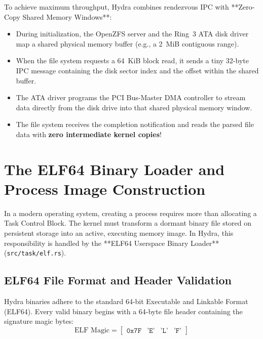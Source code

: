 To achieve maximum throughput, Hydra combines rendezvous IPC with **Zero-Copy Shared Memory Windows**:
\begin{itemize}
    \item During initialization, the OpenZFS server and the Ring~3 ATA disk driver map a shared physical memory buffer (e.g., a 2~MiB contiguous range).
    \item When the file system requests a 64~KiB block read, it sends a tiny 32-byte IPC message containing the disk sector index and the offset within the shared buffer.
    \item The ATA driver programs the PCI Bus-Master DMA controller to stream data directly from the disk drive into that shared physical memory window.
    \item The file system receives the completion notification and reads the parsed file data with \textbf{zero intermediate kernel copies}!
\end{itemize}

\section{The ELF64 Binary Loader and Process Image Construction}
\label{sec:elf64_loader}

In a modern operating system, creating a process requires more than allocating a Task Control Block. The kernel must transform a dormant binary file stored on persistent storage into an active, executing memory image. In Hydra, this responsibility is handled by the **ELF64 Userspace Binary Loader** (\texttt{src/task/elf.rs}).

\subsection{ELF64 File Format and Header Validation}

Hydra binaries adhere to the standard 64-bit Executable and Linkable Format (ELF64). Every valid binary begins with a 64-byte file header containing the signature magic bytes:
\begin{equation}
\text{ELF Magic} = \begin{bmatrix} \texttt{0x7F} & \texttt{'E'} & \texttt{'L'} & \texttt{'F'} \end{bmatrix}
\end{equation}


